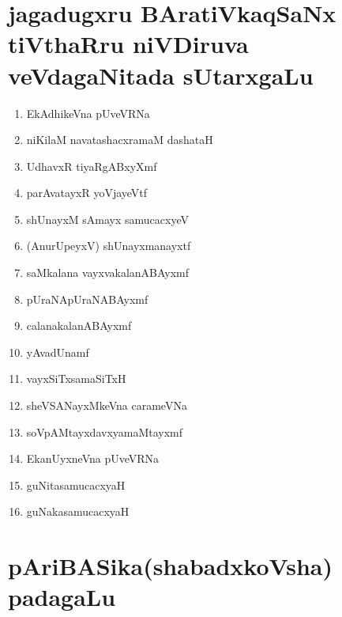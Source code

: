 {\section*{jagadugxru BAratiVkaqSaNx tiVthaRru niVDiruva veVdagaNitada sUtarxgaLu}

\begin{enumerate}[\rm 1)]
\item EkAdhikeVna pUveVRNa

\item niKilaM navatashacxramaM dashataH

\item UdhavxR tiyaRgABxyXmf 

\item parAvatayxR yoVjayeVtf 

\item shUnayxM sAmayx samucacxyeV

\item (AnurUpeyxV) shUnayxmanayxtf

\item saMkalana vayxvakalanABAyxmf

\item pUraNApUraNABAyxmf

\item calanakalanABAyxmf

\item yAvadUnamf

\item vayxSiTxsamaSiTxH

\item sheVSANayxMkeVna carameVNa

\item soVpAMtayxdavxyamaMtayxmf

\item EkanUyxneVna pUveVRNa

\item guNitasamucacxyaH

\item guNakasamucacxyaH
\end{enumerate}

\section*{pAriBASika(shabadxkoVsha) padagaLu}

}
